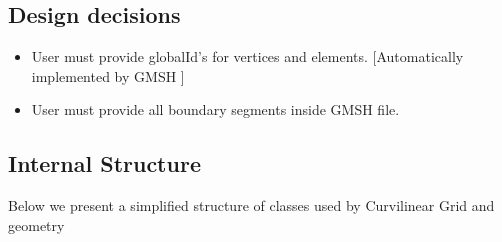 \subsection{Design decisions}
\label{section-outline-designdecisions}

\begin{itemize}
	\item User must provide globalId's for vertices and elements. [Automatically implemented by GMSH \citeGMSH]
	\item User must provide all boundary segments inside GMSH file.
\end{itemize}


\subsection{Internal Structure}
\label{section-outline-internalstructure}

Below we present a simplified structure of classes used by Curvilinear Grid and geometry \\

